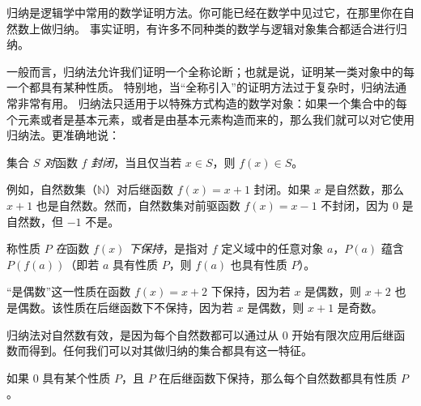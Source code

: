 \documentclass[../../include/open-logic-section]{subfiles}
\begin{document}


\begin{explain}
归纳是逻辑学中常用的数学证明方法。你可能已经在数学中见过它，在那里你在自然数上做归纳。
事实证明，有许多不同种类的数学与逻辑对象集合都适合进行归纳。

一般而言，归纳法允许我们证明一个全称论断；也就是说，证明某一类对象中的每一个都具有某种性质。
特别地，当“全称引入”的证明方法过于复杂时，归纳法通常非常有用。
归纳法只适用于以特殊方式构造的数学对象：如果一个集合中的每个元素或者是基本元素，或者是由基本元素构造而来的，那么我们就可以对它使用归纳法。更准确地说：
\end{explain}

\begin{defn}
集合 $S$ \emph{对}函数 $f$ \emph{封闭}，当且仅当若 $x \in S$，则 $f(x) \in S$。
\end{defn}

\begin{explain}
例如，自然数集（$\mathbb{N}$）对后继函数 $f(x) = x+1$ 封闭。如果 $x$ 是自然数，那么 $x+1$ 也是自然数。然而，自然数集对前驱函数 $f(x) = x-1$ 不封闭，因为 $0$ 是自然数，但 $-1$ 不是。
\end{explain}

\begin{defn}
称性质 $P$ \emph{在}函数 $f(x)$ \emph{下保持}，是指对 $f$ 定义域中的任意对象 $a$，$P(a)$ 蕴含 $P(f(a))$（即若 $a$ 具有性质 $P$，则 $f(a)$ 也具有性质 $P$）。
\end{defn}

\begin{explain}
“是偶数”这一性质在函数 $f(x) = x+2$ 下保持，因为若 $x$ 是偶数，则 $x+2$ 也是偶数。该性质在后继函数下不保持，因为若 $x$ 是偶数，则 $x+1$ 是奇数。

归纳法对自然数有效，是因为每个自然数都可以通过从 $0$ 开始有限次应用后继函数而得到。任何我们可以对其做归纳的集合都具有这一特征。
\end{explain}

\begin{defn}[自然数上的归纳]
如果 $0$ 具有某个性质 $P$，且 $P$ 在后继函数下保持，那么每个自然数都具有性质 $P$。
\end{defn}
\end{document}
